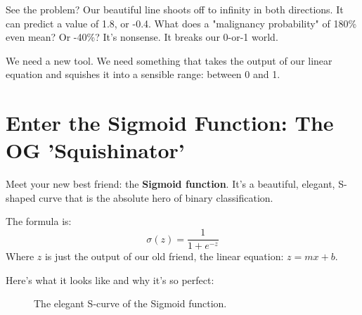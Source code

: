 \documentclass[11pt, letterpaper, openany]{book}
\begin{document}
See the problem? Our beautiful line shoots off to infinity in both directions. It can predict a value of 1.8, or -0.4. What does a "malignancy probability" of 180\% even mean? Or -40\%? It's nonsense. It breaks our 0-or-1 world.

We need a new tool. We need something that takes the output of our linear equation and squishes it into a sensible range: between 0 and 1.

\section{Enter the Sigmoid Function: The OG 'Squishinator'}

Meet your new best friend: the \textbf{Sigmoid function}. It's a beautiful, elegant, S-shaped curve that is the absolute hero of binary classification.

The formula is:
\[ \sigma(z) = \frac{1}{1 + e^{-z}} \]
Where $z$ is just the output of our old friend, the linear equation: $z = mx + b$.

Here's what it looks like and why it's so perfect:

\begin{figure}[h!]
\centering
{}
\caption{The elegant S-curve of the Sigmoid function.}
\end{figure}
\end{document}
